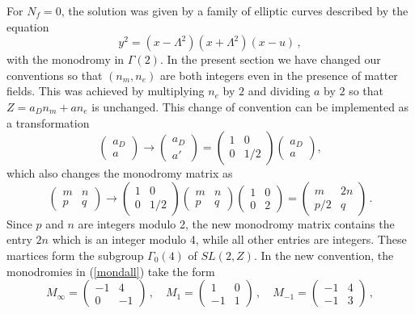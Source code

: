 For $N_f = 0$, the solution was given by a family of elliptic curves
described by the equation
$$
y^2 = (x - \Lambda^2 )(x + \Lambda ^2 )(x-u) \,,
$$
with the monodromy in $\Gamma(2)$. In the present section we have
changed our conventions so that $(n_m , n_e )$ are both integers even
in the presence of matter fields. This was achieved by multiplying
$n_e$ by $2$ and dividing $a$ by $2$ so that $Z = a_D n_m + a n_e$ is
unchanged. This change of convention can be implemented as a
transformation  
$$
\left ( \begin{array}{cc} a_D \\ a \end{array} \right ) \rightarrow
\left ( \begin{array}{cc} a_D \\ a' \end{array} \right ) =
\left ( \begin{array}{cc} 1 & 0 \\ 0 & 1/2 \end{array} \right )
\left ( \begin{array}{cc} a_D \\ a \end{array} \right ),
$$
which also changes the monodromy matrix as
$$
\left ( \begin{array}{cc} m & n \\ p & q \end{array} \right )
\rightarrow
\left ( \begin{array}{cc} 1 & 0 \\ 0 & 1/2 \end{array} \right )
\left ( \begin{array}{cc} m & n \\ p & q \end{array} \right )
\left ( \begin{array}{cc} 1 & 0 \\ 0 & 2 \end{array} \right ) =
\left ( \begin{array}{cc} m & 2n \\ p/2 & q \end{array} \right )\,.
$$
Since $p$ and $n$ are integers modulo 2, the new monodromy matrix
contains the entry $2n$ which is an integer modulo 4, while all other
entries are integers. These martices form the subgroup $\Gamma_{0}(4)$
of $SL(2,Z)$. In the new convention, the monodromies in (\ref{mondall})
take the form
\begin{equation}
M_{\infty} = \left( \begin{array}{cc}
-1 & 4 \\ 0 & -1 \end{array} \right )\,, \quad
M_{1} = \left( \begin{array}{cc}
1 & 0 \\ -1 & 1 \end{array} \right )\,, \quad
M_{-1} = \left( \begin{array}{cc}
-1 & 4 \\ -1 & 3 \end{array} \right )\,,
\end{equation}
